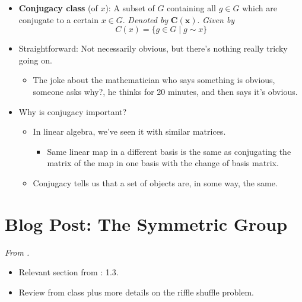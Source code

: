 \documentclass[../notes.tex]{subfiles}
\begin{document}
\begin{itemize}
\begin{enumerate}[label={(\Roman*)}]
        \begin{proof}
            Suppose $y=gxg^{-1}$ and $z=hyh^{-1}$. Then
            \begin{equation*}
                z = hgxg^{-1}h^{-1}
                = (hg)x(hg)^{-1}
            \end{equation*}
        \end{proof}
    \end{enumerate}
    \item \textbf{Conjugacy class} (of $x$): A subset of $G$ containing all $g\in G$ which are conjugate to a certain $x\in G$. \emph{Denoted by} $\bm{C(x)}$. \emph{Given by}
    \begin{equation*}
        C(x) = \{g\in G\mid g\sim x\}
    \end{equation*}
    \item Straightforward: Not necessarily obvious, but there's nothing really tricky going on.
    \begin{itemize}
        \item The joke about the mathematician who says something is obvious, someone asks why?, he thinks for 20 minutes, and then says it's obvious.
    \end{itemize}
    \item Why is conjugacy important?
    \begin{itemize}
        \item In linear algebra, we've seen it with similar matrices.
        \begin{itemize}
            \item Same linear map in a different basis is the same as conjugating the matrix of the map in one basis with the change of basis matrix.
        \end{itemize}
        \item Conjugacy tells us that a set of objects are, in some way, the same.
    \end{itemize}
\end{itemize}



\section{Blog Post: The Symmetric Group}
\emph{From \textcite{bib:Calegari}.}
\begin{itemize}
    \item {}Relevant section from \textcite{bib:DummitFoote}: 1.3.
    \item Review from class plus more details on the riffle shuffle problem.
\end{itemize}
\end{document}
